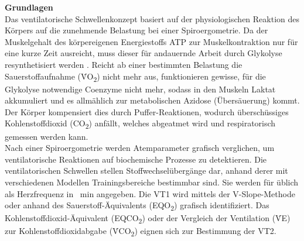 \textbf{\Large Grundlagen}\\

Das ventilatorische Schwellenkonzept basiert auf der physiologischen Reaktion des Körpers auf die zunehmende Belastung bei einer Spiroergometrie. Da der Muskelgehalt des körpereigenen Energiestoffs ATP zur Muskelkontraktion nur für eine kurze Zeit ausreicht, muss dieser für andauernde Arbeit durch Glykolyse resynthetisiert werden \cite{Kroidl.2015}. Reicht ab einer bestimmten Belastung die Sauerstoffaufnahme (\.{V}O\textsubscript{2}) nicht mehr aus, funktionieren gewisse, für die Glykolyse notwendige Coenzyme nicht mehr, sodass in den Muskeln Laktat akkumuliert und es allmählich zur metabolischen Azidose (Übersäuerung) kommt. Der Körper kompensiert dies durch Puffer-Reaktionen, wodurch überschüssiges Kohlenstoffdioxid (CO\textsubscript{2}) anfällt, welches abgeatmet wird und respiratorisch gemessen werden kann.\\
Nach einer Spiroergometrie werden Atemparameter grafisch verglichen, um ventilatorische Reaktionen auf biochemische Prozesse zu detektieren. Die ventilatorischen Schwellen stellen Stoffwechselübergänge dar, anhand derer mit verschiedenen Modellen Trainingsbereiche bestimmbar sind. Sie werden für üblich als Herzfrequenz in \si{\per\minute} angegeben. Die VT1 wird mittels der V-Slope-Methode oder anhand des Sauerstoff-Äquivalents (EQO\textsubscript{2}) grafisch identifiziert. Das Kohlenstoffdioxid-Äquivalent (EQCO\textsubscript{2}) oder der Vergleich der Ventilation (\.{V}E) zur Kohlenstoffdioxidabgabe (\.{V}CO\textsubscript{2}) eignen sich zur Bestimmung der VT2.\\

